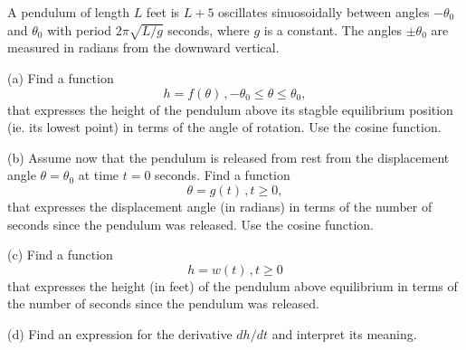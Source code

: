 \documentclass{ximera}
\begin{document}
\begin{exercise}  \label{E:dfdr3hgret333}
A pendulum of length $L$ feet is $L+5$ oscillates sinuosoidally between angles $-\theta_0$ and $\theta_0$ with period $2\pi\sqrt{L/g}$ seconds, where $g$ is a constant. The angles $\pm \theta_0$ are measured in radians from the downward vertical.

(a) Find a function 
\[
     h = f(\theta) \, , -\theta_0 \leq \theta \leq \theta_0 ,
\]
that expresses the height of the pendulum above its stagble equilibrium position (ie. its lowest point) in terms of the angle of rotation. Use the cosine function.

(b) Assume now that the pendulum is released from rest from the displacement angle $\theta = \theta_0$ at time $t=0$ seconds. Find a function
\[
       \theta = g(t) \, , t\geq 0 ,
\]
that expresses the displacement angle (in radians) in terms of the number of seconds since the pendulum was released. Use the cosine function.

(c) Find a function 
\[
      h = w(t)  \, , t\geq 0
\]
that expresses the height (in feet) of the pendulum above equilibrium in terms of the number of seconds since the pendulum was released.

(d) Find an expression for the derivative $dh/dt$ and interpret its meaning.

\end{exercise}
\end{document}
